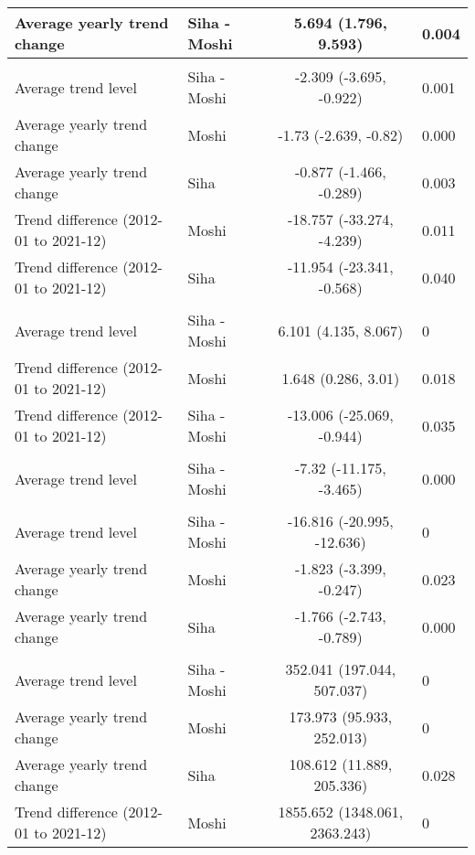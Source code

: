 \begin{longtable}{l|lcl}
Average yearly trend change & Siha - Moshi & 5.694 (1.796, 9.593) & 0.004 \\ 
\midrule\addlinespace[2.5pt]
\multicolumn{4}{l}{Schistosomiasis} \\ 
\midrule\addlinespace[2.5pt]
Average trend level & Siha - Moshi & -2.309 (-3.695, -0.922) & 0.001 \\ 
Average yearly trend change & Moshi & -1.73 (-2.639, -0.82) & 0.000 \\ 
Average yearly trend change & Siha & -0.877 (-1.466, -0.289) & 0.003 \\ 
Trend difference (2012-01 to 2021-12) & Moshi & -18.757 (-33.274, -4.239) & 0.011 \\ 
Trend difference (2012-01 to 2021-12) & Siha & -11.954 (-23.341, -0.568) & 0.040 \\ 
\midrule\addlinespace[2.5pt]
\multicolumn{4}{l}{Snake and Insect Bites} \\ 
\midrule\addlinespace[2.5pt]
Average trend level & Siha - Moshi & 6.101 (4.135, 8.067) & 0 \\ 
Trend difference (2012-01 to 2021-12) & Moshi & 1.648 (0.286, 3.01) & 0.018 \\ 
Trend difference (2012-01 to 2021-12) & Siha - Moshi & -13.006 (-25.069, -0.944) & 0.035 \\ 
\midrule\addlinespace[2.5pt]
\multicolumn{4}{l}{Substance Abuse} \\ 
\midrule\addlinespace[2.5pt]
Average trend level & Siha - Moshi & -7.32 (-11.175, -3.465) & 0.000 \\ 
\midrule\addlinespace[2.5pt]
\multicolumn{4}{l}{Tuberculosis} \\ 
\midrule\addlinespace[2.5pt]
Average trend level & Siha - Moshi & -16.816 (-20.995, -12.636) & 0 \\ 
Average yearly trend change & Moshi & -1.823 (-3.399, -0.247) & 0.023 \\ 
Average yearly trend change & Siha & -1.766 (-2.743, -0.789) & 0.000 \\ 
\midrule\addlinespace[2.5pt]
\multicolumn{4}{l}{Upper Respiratory Infections} \\ 
\midrule\addlinespace[2.5pt]
Average trend level & Siha - Moshi & 352.041 (197.044, 507.037) & 0 \\ 
Average yearly trend change & Moshi & 173.973 (95.933, 252.013) & 0 \\ 
Average yearly trend change & Siha & 108.612 (11.889, 205.336) & 0.028 \\ 
Trend difference (2012-01 to 2021-12) & Moshi & 1855.652 (1348.061, 2363.243) & 0 \\ 

\end{longtable}
